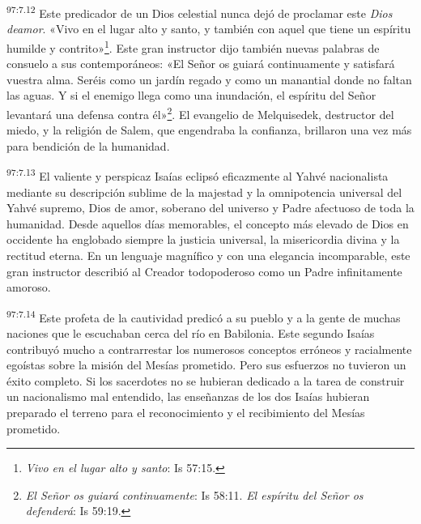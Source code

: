\par
\textsuperscript{97:7.12} Este predicador de un Dios celestial nunca dejó de proclamar este \textit{Dios deamor}. «Vivo en el lugar alto y santo, y también con aquel que tiene un espíritu humilde y contrito»\footnote{\textit{Vivo en el lugar alto y santo}: Is 57:15.}. Este gran instructor dijo también nuevas palabras de consuelo a sus contemporáneos: «El Señor os guiará continuamente y satisfará vuestra alma. Seréis como un jardín regado y como un manantial donde no faltan las aguas. Y si el enemigo llega como una inundación, el espíritu del Señor levantará una defensa contra él»\footnote{\textit{El Señor os guiará continuamente}: Is 58:11. \textit{El espíritu del Señor os defenderá}: Is 59:19.}. El evangelio de Melquisedek, destructor del miedo, y la religión de Salem, que engendraba la confianza, brillaron una vez más para bendición de la humanidad.

\par
\textsuperscript{97:7.13} El valiente y perspicaz Isaías eclipsó eficazmente al Yahvé nacionalista mediante su descripción sublime de la majestad y la omnipotencia universal del Yahvé supremo, Dios de amor, soberano del universo y Padre afectuoso de toda la humanidad. Desde aquellos días memorables, el concepto más elevado de Dios en occidente ha englobado siempre la justicia universal, la misericordia divina y la rectitud eterna. En un lenguaje magnífico y con una elegancia incomparable, este gran instructor describió al Creador todopoderoso como un Padre infinitamente amoroso.

\par
\textsuperscript{97:7.14} Este profeta de la cautividad predicó a su pueblo y a la gente de muchas naciones que le escuchaban cerca del río en Babilonia. Este segundo Isaías contribuyó mucho a contrarrestar los numerosos conceptos erróneos y racialmente egoístas sobre la misión del Mesías prometido. Pero sus esfuerzos no tuvieron un éxito completo. Si los sacerdotes no se hubieran dedicado a la tarea de construir un nacionalismo mal entendido, las enseñanzas de los dos Isaías hubieran preparado el terreno para el reconocimiento y el recibimiento del Mesías prometido.

